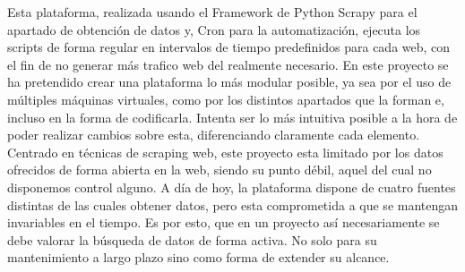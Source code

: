 \newline
Esta plataforma, realizada usando el Framework de Python Scrapy para el apartado de obtención de datos y, Cron para la automatización, ejecuta los scripts de forma regular en intervalos de tiempo predefinidos para cada web, con el fin de no generar más trafico web del realmente necesario.\newline
\newline
En este proyecto se ha pretendido crear una plataforma lo más modular posible, ya sea por el uso de múltiples máquinas virtuales, como por los distintos apartados que la forman e, incluso en la forma de codificarla. Intenta ser lo más intuitiva posible a la hora de poder realizar cambios sobre esta, diferenciando claramente cada elemento.\newline
\newline
Centrado en técnicas de scraping web, este proyecto esta limitado por los datos ofrecidos de forma abierta en la web, siendo su punto débil, aquel del cual no disponemos control alguno. A día de hoy, la plataforma dispone de cuatro fuentes distintas de las cuales obtener datos, pero esta comprometida a que se mantengan invariables en el tiempo. Es por esto, que en un proyecto así necesariamente se debe valorar la búsqueda de datos de forma activa. No solo para su mantenimiento a largo plazo sino como forma de extender su alcance.\newline
\newline
